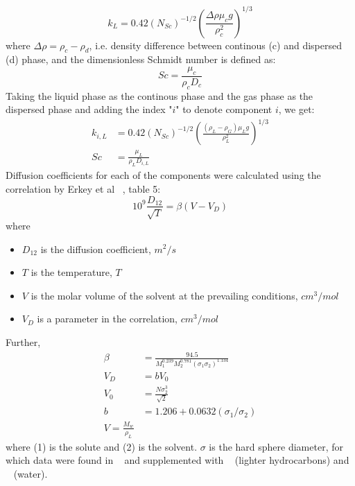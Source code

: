 \documentclass{article}
\begin{document}
\begin{equation}
		k_L = 0.42(N_{Sc})^{-1/2} \left(\frac{\Delta \rho \mu_c g}{\rho_c^2}\right)^{1/3}
\end{equation}
where $\Delta \rho = \rho_c - \rho_d$, i.e. density difference between continous (c) and dispersed (d) phase, and the dimensionless Schmidt number is defined as:
\begin{equation}
	Sc = \frac{\mu_c}{\rho_cD_c}
\end{equation}
Taking the liquid phase as the continous phase and the gas phase as the dispersed phase and adding the index "$i$" to denote component $i$, we get:
\begin{equation}
	\begin{split}
		k_{i,L} &= 0.42(N_{Sc})^{-1/2} \left(\frac{(\rho_L - \rho_G) \mu_L g}{\rho_L^2}\right)^{1/3} \\
		Sc &= \frac{\mu_L}{\rho_LD_{i,L}}
		\end{split}
\end{equation}
Diffusion coefficients for each of the components were calculated using the correlation by Erkey et al ~\cite{ErkeyRoddenAkgerman1990a}, table 5:
\begin{equation}
	10^9\frac{D_{12}}{\sqrt{T}} = \beta(V-V_D)
\end{equation}
where 
\begin{itemize}
	\item $D_{12}$ is the diffusion coefficient, $m^2/s$
	\item $T$ is the temperature, $T$
	\item $V$ is the molar volume of the solvent at the prevailing conditions, $cm^3/mol$
	\item $V_D$ is a parameter in the correlation, $cm^3/mol$
\end{itemize}
Further, 
\begin{equation}
	\begin{split}
	\beta &= \frac{94.5}{M_1^{0.239} M_2^{0.781}(\sigma_1\sigma_2)^{1.134}} \\
	V_D &= bV_0 \\
	V_0 &= \frac{N\sigma_2^3 }{\sqrt{2}}\\
	b &= 1.206 + 0.0632(\sigma_1 / \sigma_2) \\
	V = \frac{M_w}{\rho_L}
	\end{split}
\end{equation}
where (1) is the solute and (2) is the solvent. $\sigma$ is the hard sphere diameter, for which data were found in ~\cite{ErkeyRoddenAkgerman1990a} and supplemented with ~\cite{BirdStewartLightfoot2007} (lighter hydrocarbons) and ~\cite{Schatzberg1967} (water). 
\end{document}
